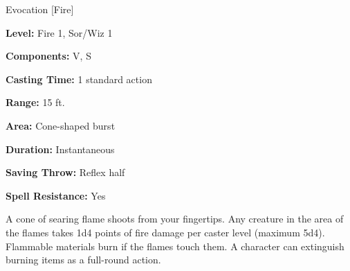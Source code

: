 
Evocation [Fire]

\textbf{Level:} Fire 1, Sor/Wiz 1

\textbf{Components:} V, S

\textbf{Casting Time:} 1 standard action

\textbf{Range:} 15 ft.

\textbf{Area:} Cone-shaped burst

\textbf{Duration:} Instantaneous

\textbf{Saving Throw:} Reflex half

\textbf{Spell Resistance:} Yes

A cone of searing flame shoots from your fingertips. Any creature in the area of 
the flames takes 1d4 points of fire damage per caster level (maximum 5d4). Flammable 
materials burn if the flames touch them. A character can extinguish burning items 
as a full-round action.

